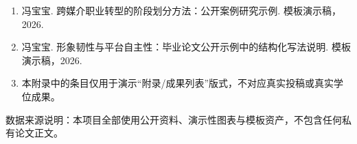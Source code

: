 \begin{enumerate}
    \item 冯宝宝. 跨媒介职业转型的阶段划分方法：公开案例研究示例. 模板演示稿，2026.
    \item 冯宝宝. 形象韧性与平台自主性：毕业论文公开示例中的结构化写法说明. 模板演示稿，2026.
    \item 本附录中的条目仅用于演示“附录/成果列表”版式，不对应真实投稿或真实学位成果。
\end{enumerate}

\vspace{1.5\baselineskip}
\noindent 数据来源说明：本项目全部使用公开资料、演示性图表与模板资产，不包含任何私有论文正文。
